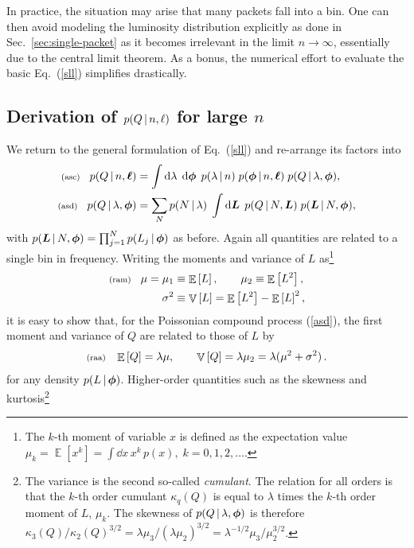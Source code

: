 \documentclass[11pt]{article}
\newcommand{\lleq}[1]{\label{#1} }
\renewcommand{\lleq}[1]{\label{#1} {\scriptstyle {\rm (#1)}} \hspace*{2ex} }
\newcommand{\cond}{\,|\,}
\newcommand{\refeq}[1]{Eq.~(\ref{#1})}
\newcommand{\refsec}[1]{Sec.~\ref{sec:#1}}
\DeclareMathOperator{\Expect}{\mathbb{E}}
\newcommand{\expect}[1]{\Expect\left[#1\right]}
\newcommand{\Lum}{L}
\newcommand{\rmdx}[1]{\dd{#1}} %
\DeclareMathOperator{\Variance}{\mathbb{V}}
\newcommand{\variance}[1]{\Variance\left[#1\right]}
\begin{document}
In practice, the situation may arise that many packets fall into a
bin. One can then avoid modeling the luminosity distribution
explicitly as done in \refsec{single-packet} as it becomes irrelevant
in the limit $n \to \infty$, essentially due to the central limit
theorem. As a bonus, the numerical effort to evaluate the basic
\refeq{sll} simplifies drastically.

\subsection{Derivation of $p(Q\,|\,n,\boldmath{\ell})$ for large $n$}

We return to the general formulation of \refeq{sll} and re-arrange its
factors into
\begin{align}
  \lleq{asc}
  p(Q\cond n,\bml)
  &= \int \rmdx{\lambda}\; \rmdx{\bmphi}\;
    p(\lambda\cond n)\;
    p(\bmphi\cond n,\bml)\;
    p(Q\cond \lambda,\bmphi), \\
  \lleq{asd}
  p(Q\cond \lambda,\bmphi)
  &= \sum_N
    p(N\cond \lambda)\;
    \int \rmdx{\bmL}\;
    p(Q\cond N,\bmL)\;
    p(\bmL\cond N,\bmphi),
\end{align}
with $p(\bmL\cond N,\bmphi) = \prod_{j=1}^N p(L_j\cond\bmphi)$ as
before. Again all quantities are related to a single bin in frequency.
Writing the moments and variance of $L$ as\footnote{The $k$-th moment
  of variable $x$ is defined as the expectation value $\mu_k =
  \expect{x^k} = \int \rmdx{x}\,x^k\,p(x),\; k = 0,1,2,\ldots$.} %
\begin{align}
  \lleq{ram}
  \mu =  \mu_1 &\equiv \expect{\Lum}, \qquad
  \mu_2 \equiv \expect{\Lum^2}, \\
  \sigma^2 &\equiv \variance{\Lum}
  = \expect{\Lum^2} - \expect{\Lum}^2,
\end{align}
it is easy to show that, for the Poissonian compound process
(\ref{asd}), the first moment and variance of $Q$ are related to those
of $L$ by
\begin{align}
  \lleq{raa}
  \expect{Q} = \lambda \mu, \qquad
  \variance{Q} = \lambda \mu_2 = \lambda (\mu^2 + \sigma^2) \,.
\end{align}
for any density $p(L\cond\bmphi)$.
%
Higher-order quantities such as the skewness and kurtosis\footnote{
  The variance is the second so-called \textit{cumulant}. The relation
  for all orders is that the $k$-th order cumulant $\kappa_q(Q)$ is
  equal to $\lambda$ times the $k$-th order moment of $L$,
  $\mu_k$. The skewness of $p(Q\cond \lambda,\bmphi)$ is therefore
  $\kappa_3(Q)/\kappa_2(Q)^{3/2} = \lambda \mu_3/(\lambda \mu_2)^{3/2}
  = \lambda^{-1/2} \mu_3/\mu_2^{3/2}$.}  %
\end{document}
